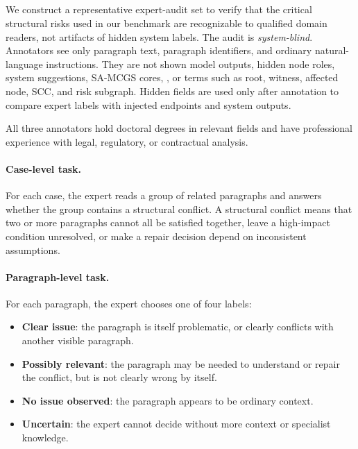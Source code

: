 \documentclass[11pt]{article}
\newcommand{\samcgs}{SA-MCGS}
\newcommand{\naive}{Naive}
\newcommand{\scc}{SCC}
\begin{document}
\subsection{}

We construct a representative expert-audit set to verify that the critical structural risks used in our benchmark are recognizable to qualified domain readers, not artifacts of hidden system labels.  The audit is \emph{system-blind}.  Annotators see only paragraph text, paragraph identifiers, and ordinary natural-language instructions.  They are not shown model outputs, hidden node roles, system suggestions, \samcgs{} cores, \revnewreplace{\naive{} subgraphs}{baseline subgraphs}, or terms such as root, witness, affected node, \scc{}, and risk subgraph.  Hidden fields are used only after annotation to compare expert labels with injected endpoints and system outputs.

All three annotators hold doctoral degrees in relevant fields and have professional experience with legal, regulatory, or contractual analysis. 

\paragraph{Case-level task.}
For each case, the expert reads a group of related paragraphs and answers whether the group contains a structural conflict.  A structural conflict means that two or more paragraphs cannot all be satisfied together, leave a high-impact condition unresolved, or make a repair decision depend on inconsistent assumptions.

\paragraph{Paragraph-level task.}
For each paragraph, the expert chooses one of four labels:
\begin{itemize}[leftmargin=*,itemsep=1pt]
    \item \textbf{Clear issue}: the paragraph is itself problematic, or clearly conflicts with another visible paragraph.
    \item \textbf{Possibly relevant}: the paragraph may be needed to understand or repair the conflict, but is not clearly wrong by itself.
    \item \textbf{No issue observed}: the paragraph appears to be ordinary context.
    \item \textbf{Uncertain}: the expert cannot decide without more context or specialist knowledge.
\end{itemize}
\end{document}

